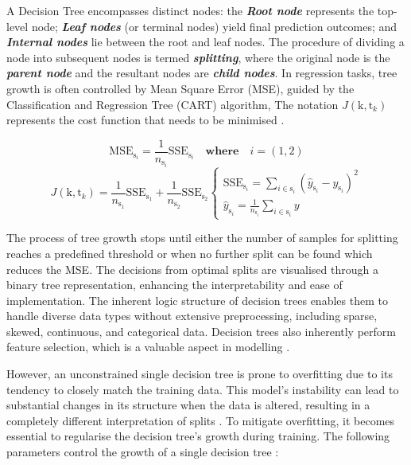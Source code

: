 \documentclass[]{interact}
\theoremstyle{plain}%
\theoremstyle{definition}
\theoremstyle{remark}
\begin{document}
A Decision Tree encompasses distinct nodes: the \textbf{\emph{Root node}} represents the top-level node; \textbf{\emph{Leaf nodes}} (or terminal nodes) yield final prediction outcomes; and \textbf{\emph{Internal nodes}} lie between the root and leaf nodes. The procedure of dividing a node into subsequent nodes is termed \textbf{\emph{splitting}}, where the original node is the \textbf{\emph{parent node}} and the resultant nodes are \textbf{\emph{child nodes}}. In regression tasks, tree growth is often controlled by Mean Square Error (MSE), guided by the Classification and Regression Tree (CART) algorithm, The notation $J(\text{k},\text{t}_k)$ represents the cost function that needs to be minimised \citep{Geron.2019}.

\begin{equation}\label{eqn:sse}
  \text{MSE}_{\text{s}_i} = \frac{1}{n_{\text{s}_i}}\text{SSE}_{\text{s}_i} \quad \textbf{where} \quad i = (1,2)   
\end{equation}
\begin{equation}\label{eqn:costfun}
  J(\text{k},\text{t}_k) = \frac{1}{n_{\text{s}_1}}\text{SSE}_{\text{s}_1} + \frac{1}{n_{\text{s}_2}}\text{SSE}_{\text{s}_2}
  \begin{cases}
      \text{SSE}_{\text{s}_i} = \sum\limits_{i \in \text{s}_i}(\hat{y}_{\text{s}_i} - y_{\text{s}_i} )^2 \\
      \hat{y}_{\text{s}_i} = \frac{1}{n_{\text{s}_i}}\sum\limits_{i\in \text{s}_i} y
  \end{cases}  
\end{equation}

The process of tree growth stops until either the number of samples for splitting reaches a predefined threshold or when no further split can be found which reduces the MSE. The decisions from optimal splits are visualised through a binary tree representation, enhancing the interpretability and ease of implementation. The inherent logic structure of decision trees enables them to handle diverse data types without extensive preprocessing, including sparse, skewed, continuous, and categorical data. Decision trees also inherently perform feature selection, which is a valuable aspect in modelling \citep{Kuhn.2013}.

However, an unconstrained single decision tree is prone to overfitting due to its tendency to closely match the training data. This model's instability can lead to substantial changes in its structure when the data is altered, resulting in a completely different interpretation of splits \citep{Hastie.2009, Kuhn.2013}. To mitigate overfitting, it becomes essential to regularise the decision tree's growth during training. The following parameters control the growth of a single decision tree : 
\end{document}
